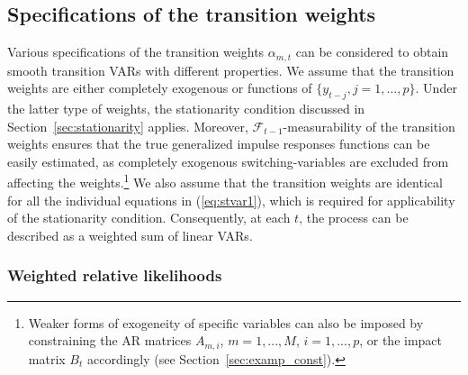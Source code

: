 \documentclass[nojss]{jss}
\begin{document}
\subsection{Specifications of the transition weights}

Various specifications of the transition weights $\alpha_{m,t}$ can be considered to obtain smooth transition VARs with different properties. We assume that the transition weights are either completely exogenous or functions of $\lbrace y_{t-j}, j=1,...,p \rbrace$. Under the latter type of weights, the stationarity condition discussed in Section~\ref{sec:stationarity} applies. Moreover, $\mathcal{F}_{t-1}$-measurability of the transition weights ensures that the true generalized impulse responses functions can be easily estimated, as completely exogenous switching-variables are excluded from affecting the weights.\footnote{Weaker forms of exogeneity of specific variables can also be imposed by constraining the AR matrices $A_{m,i}$, $m=1,...,M$, $i=1,...,p$, or the impact matrix $B_t$ accordingly (see Section~\ref{sec:examp_const}).} We also assume that the transition weights are identical for all the individual equations in (\ref{eq:stvar1}), which is required for applicability of the stationarity condition. Consequently, at each $t$‚ the process can be described as a weighted sum of linear VARs.

\subsubsection{Weighted relative likelihoods}\label{sec:rel_dens}
\end{document}
